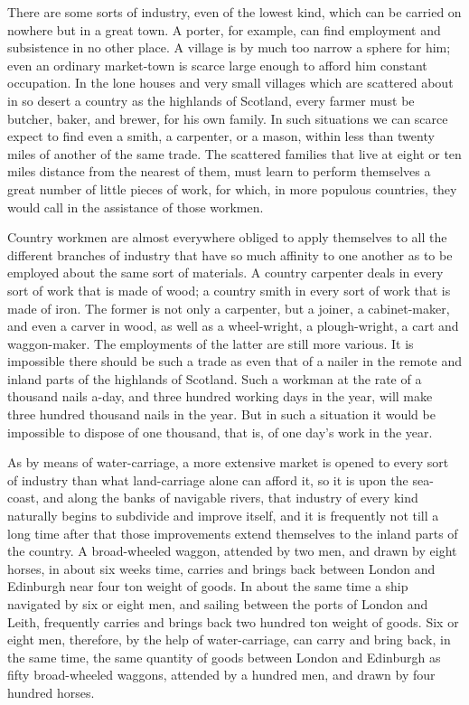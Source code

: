 There are some sorts of industry, even of the lowest kind, which can be carried on nowhere but in a great town. A porter, for example, can find employment and subsistence in no other place. A village is by much too narrow a sphere for him; even an ordinary market-town is scarce large enough to afford him constant occupation. In the lone houses and very small villages which are scattered about in so desert a country as the highlands of Scotland, every farmer must be butcher, baker, and brewer, for his own family. In such situations we can scarce expect to find even a smith, a carpenter, or a mason, within less than twenty miles of another of the same trade. The scattered families that live at eight or ten miles distance from the nearest of them, must learn to perform themselves a great number of little pieces of work, for which, in more populous countries, they would call in the assistance of those workmen.\par

Country workmen are almost everywhere obliged to apply themselves to all the different branches of industry that have so much affinity to one another as to be employed about the same sort of materials. A country carpenter deals in every sort of work that is made of wood; a country smith in every sort of work that is made of iron. The former is not only a carpenter, but a joiner, a cabinet-maker, and even a carver in wood, as well as a wheel-wright, a plough-wright, a cart and waggon-maker. The employments of the latter are still more various. It is impossible there should be such a trade as even that of a nailer in the remote and inland parts of the highlands of Scotland. Such a workman at the rate of a thousand nails a-day, and three hundred working days in the year, will make three hundred thousand nails in the year. But in such a situation it would be impossible to dispose of one thousand, that is, of one day’s work in the year.\par

As by means of water-carriage, a more extensive market is opened to every sort of industry than what land-carriage alone can afford it, so it is upon the sea-coast, and along the banks of navigable rivers, that industry of every kind naturally begins to subdivide and improve itself, and it is frequently not till a long time after that those improvements extend themselves to the inland parts of the country. A broad-wheeled waggon, attended by two men, and drawn by eight horses, in about six weeks time, carries and brings back between London and Edinburgh near four ton weight of goods. In about the same time a ship navigated by six or eight men, and sailing between the ports of London and Leith, frequently carries and brings back two hundred ton weight of goods. Six or eight men, therefore, by the help of water-carriage, can carry and bring back, in the same time, the same quantity of goods between London and Edinburgh as fifty broad-wheeled waggons, attended by a hundred men, and drawn by four hundred horses.\par

